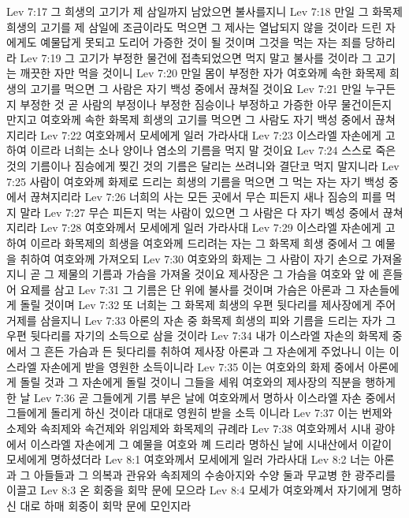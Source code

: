 Lev 7:17  그 희생의 고기가 제 삼일까지 남았으면 불사를지니
Lev 7:18  만일 그 화목제 희생의 고기를 제 삼일에 조금이라도 먹으면 그 제사는 열납되지 않을 것이라 드린 자에게도 예물답게 못되고 도리어 가증한 것이 될 것이며 그것을 먹는 자는 죄를 당하리라
Lev 7:19  그 고기가 부정한 물건에 접촉되었으면 먹지 말고 불사를 것이라 그 고기는 깨끗한 자만 먹을 것이니
Lev 7:20  만일 몸이 부정한 자가 여호와께 속한 화목제 희생의 고기를 먹으면 그 사람은 자기 백성 중에서 끊쳐질 것이요
Lev 7:21  만일 누구든지 부정한 것 곧 사람의 부정이나 부정한 짐승이나 부정하고 가증한 아무 물건이든지 만지고 여호와께 속한 화목제 희생의 고기를 먹으면 그 사람도 자기 백성 중에서 끊쳐지리라
Lev 7:22  여호와께서 모세에게 일러 가라사대
Lev 7:23  이스라엘 자손에게 고하여 이르라 너희는 소나 양이나 염소의 기름을 먹지 말 것이요
Lev 7:24  스스로 죽은 것의 기름이나 짐승에게 찢긴 것의 기름은 달리는 쓰려니와 결단코 먹지 말지니라
Lev 7:25  사람이 여호와께 화제로 드리는 희생의 기름을 먹으면 그 먹는 자는 자기 백성 중에서 끊쳐지리라
Lev 7:26  너희의 사는 모든 곳에서 무슨 피든지 새나 짐승의 피를 먹지 말라
Lev 7:27  무슨 피든지 먹는 사람이 있으면 그 사람은 다 자기 벡성 중에서 끊쳐지리라
Lev 7:28  여호와께서 모세에게 일러 가라사대
Lev 7:29  이스라엘 자손에게 고하여 이르라 화목제의 희생을 여호와께 드리려는 자는 그 화목제 희생 중에서 그 예물을 취하여 여호와께 가져오되
Lev 7:30  여호와의 화제는 그 사람이 자기 손으로 가져올지니 곧 그 제물의 기름과 가슴을 가져올 것이요 제사장은 그 가슴을 여호와 앞 에 흔들어 요제를 삼고
Lev 7:31  그 기름은 단 위에 불사를 것이며 가슴은 아론과 그 자손들에게 돌릴 것이며
Lev 7:32  또 너희는 그 화목제 희생의 우편 뒷다리를 제사장에게 주어 거제를 삼을지니
Lev 7:33  아론의 자손 중 화목제 희생의 피와 기름을 드리는 자가 그 우편 뒷다리를 자기의 소득으로 삼을 것이라
Lev 7:34  내가 이스라엘 자손의 화목제 중에서 그 흔든 가슴과 든 뒷다리를 취하여 제사장 아론과 그 자손에게 주었나니 이는 이스라엘 자손에게 받을 영원한 소득이니라
Lev 7:35  이는 여호와의 화제 중에서 아론에게 돌릴 것과 그 자손에게 돌릴 것이니 그들을 세워 여호와의 제사장의 직분을 행하게 한 날
Lev 7:36  곧 그들에게 기름 부은 날에 여호와께서 명하사 이스라엘 자손 중에서 그들에게 돌리게 하신 것이라 대대로 영원히 받을 소득 이니라
Lev 7:37  이는 번제와 소제와 속죄제와 속건제와 위임제와 화목제의 규례라
Lev 7:38  여호와께서 시내 광야에서 이스라엘 자손에게 그 예물을 여호와 꼐 드리라 명하신 날에 시내산에서 이같이 모세에게 명하셨더라
Lev 8:1  여호와께서 모세에게 일러 가라사대
Lev 8:2  너는 아론과 그 아들들과 그 의복과 관유와 속죄제의 수송아지와 수양 둘과 무교병 한 광주리를 이끌고
Lev 8:3  온 회중을 회막 문에 모으라
Lev 8:4  모세가 여호와꼐서 자기에게 명하신 대로 하매 회중이 회막 문에 모인지라
